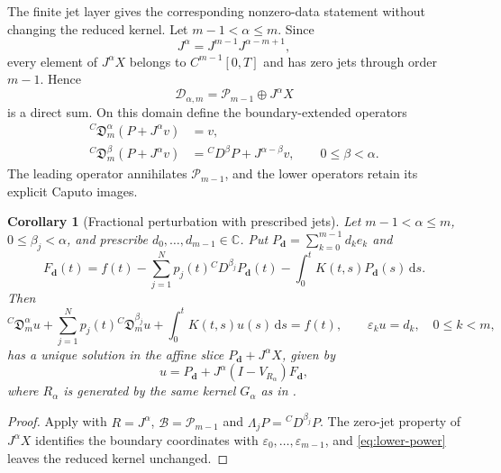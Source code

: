 \documentclass[11pt]{article}
\numberwithin{equation}{section}
\newtheorem{corollary}{Corollary}
\theoremstyle{definition}
\theoremstyle{remark}
\newcommand{\C}{\mathbb C}
\newcommand{\dd}{\,\mathrm d}
\begin{document}
The finite jet layer gives the corresponding nonzero-data statement without changing the reduced kernel. Let $m-1<\alpha\le m$. Since
\begin{equation*}
J^\alpha=J^{m-1}J^{\alpha-m+1},
\end{equation*}
every element of $J^\alpha X$ belongs to $C^{m-1}[0,T]$ and has zero jets through order $m-1$. Hence
\begin{equation*}
\mathcal D_{\alpha,m}
=\mathcal P_{m-1}\oplus J^\alpha X
\end{equation*}
is a direct sum. On this domain define the boundary-extended operators
\begin{align}
{}^C\!\mathfrak D_m^\alpha(P+J^\alpha v)&=v,\label{eq:extended-caputo-leading}\\
{}^C\!\mathfrak D_m^\beta(P+J^\alpha v)
&={}^CD^\beta P+J^{\alpha-\beta}v,
\qquad 0\le\beta<\alpha.
\label{eq:extended-caputo-lower}
\end{align}
The leading operator annihilates $\mathcal P_{m-1}$, and the lower operators retain its explicit Caputo images.

\begin{corollary}[Fractional perturbation with prescribed jets]\label{cor:fractional-jets}
Let $m-1<\alpha\le m$, $0\le\beta_j<\alpha$, and prescribe $d_0,\ldots,d_{m-1}\in\C$. Put $P_{\mathbf d}=\sum_{k=0}^{m-1}d_ke_k$ and
\begin{equation}
F_{\mathbf d}(t)
=f(t)-\sum_{j=1}^{N}p_j(t){}^CD^{\beta_j}P_{\mathbf d}(t)
-\int_0^tK(t,s)P_{\mathbf d}(s)\dd s.
\label{eq:fractional-boundary-forcing}
\end{equation}
Then
\begin{equation}
{}^C\!\mathfrak D_m^\alpha u
+\sum_{j=1}^{N}p_j(t){}^C\!\mathfrak D_m^{\beta_j}u
+\int_0^tK(t,s)u(s)\dd s=f(t),
\qquad \varepsilon_ku=d_k,\quad 0\le k<m,
\label{eq:fractional-boundary-equation}
\end{equation}
has a unique solution in the affine slice $P_{\mathbf d}+J^\alpha X$, given by
\begin{equation}
u=P_{\mathbf d}+J^\alpha(I-V_{R_\alpha})F_{\mathbf d},
\label{eq:fractional-boundary-solution}
\end{equation}
where $R_\alpha$ is generated by the same kernel $G_\alpha$ as in .
\end{corollary}

\begin{proof}
Apply  with $R=J^\alpha$, $\mathcal B=\mathcal P_{m-1}$ and $\Lambda_jP={}^CD^{\beta_j}P$. The zero-jet property of $J^\alpha X$ identifies the boundary coordinates with $\varepsilon_0,\ldots,\varepsilon_{m-1}$, and \eqref{eq:lower-power} leaves the reduced kernel unchanged.
\end{proof}
\end{document}
